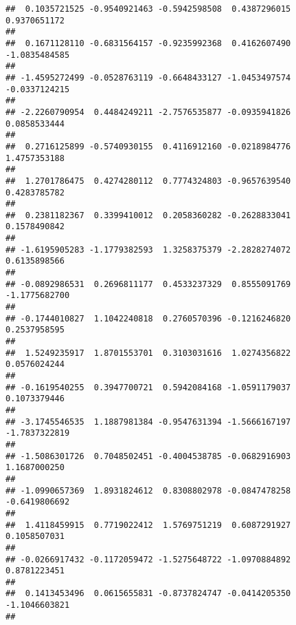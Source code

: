 \documentclass[]{article}
\begin{document}
\begin{verbatim}
##  0.1035721525 -0.9540921463 -0.5942598508  0.4387296015  0.9370651172 
##                                                                       
##  0.1671128110 -0.6831564157 -0.9235992368  0.4162607490 -1.0835484585 
##                                                                       
## -1.4595272499 -0.0528763119 -0.6648433127 -1.0453497574 -0.0337124215 
##                                                                       
## -2.2260790954  0.4484249211 -2.7576535877 -0.0935941826  0.0858533444 
##                                                                       
##  0.2716125899 -0.5740930155  0.4116912160 -0.0218984776  1.4757353188 
##                                                                       
##  1.2701786475  0.4274280112  0.7774324803 -0.9657639540  0.4283785782 
##                                                                       
##  0.2381182367  0.3399410012  0.2058360282 -0.2628833041  0.1578490842 
##                                                                       
## -1.6195905283 -1.1779382593  1.3258375379 -2.2828274072  0.6135898566 
##                                                                       
## -0.0892986531  0.2696811177  0.4533237329  0.8555091769 -1.1775682700 
##                                                                       
## -0.1744010827  1.1042240818  0.2760570396 -0.1216246820  0.2537958595 
##                                                                       
##  1.5249235917  1.8701553701  0.3103031616  1.0274356822  0.0576024244 
##                                                                       
## -0.1619540255  0.3947700721  0.5942084168 -1.0591179037  0.1073379446 
##                                                                       
## -3.1745546535  1.1887981384 -0.9547631394 -1.5666167197 -1.7837322819 
##                                                                       
## -1.5086301726  0.7048502451 -0.4004538785 -0.0682916903  1.1687000250 
##                                                                       
## -1.0990657369  1.8931824612  0.8308802978 -0.0847478258 -0.6419806692 
##                                                                       
##  1.4118459915  0.7719022412  1.5769751219  0.6087291927  0.1058507031 
##                                                                       
## -0.0266917432 -0.1172059472 -1.5275648722 -1.0970884892  0.8781223451 
##                                                                       
##  0.1413453496  0.0615655831 -0.8737824747 -0.0414205350 -1.1046603821 
##                                                                       

\end{verbatim}
\end{document}
